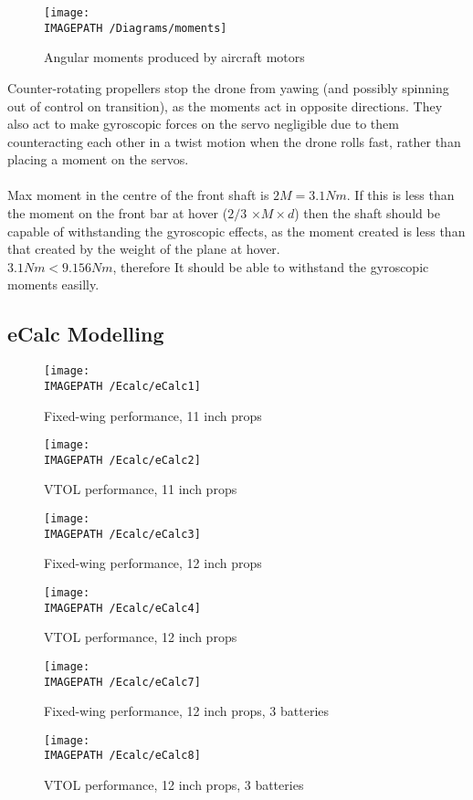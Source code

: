 \begin{figure}[!ht]
	\centering
	\texttt{[image: \\IMAGEPATH /Diagrams/moments]}
	\caption{Angular moments produced by aircraft motors}
	\label{fig:moments}
\end{figure}

 Counter-rotating propellers stop the drone from yawing (and possibly spinning out of control on transition), as the moments act in opposite directions. They also act to make gyroscopic forces on the servo negligible due to them counteracting each other in a twist motion when the drone rolls fast, rather than placing a moment on the servos.\\\\
Max moment in the centre of the front shaft is $2M = 3.1Nm$. If this is less than the moment on the front bar at hover ($2/3$ $\times M \times d$) then the shaft should be capable of withstanding the gyroscopic effects, as the moment created is less than that created by the weight of the plane at hover.\\

$3.1Nm < 9.156Nm$, therefore It should be able to withstand the gyroscopic moments easilly.

\subsection{eCalc Modelling}
\label{sec:ecalc}
\begin{figure}[H]
	\centering
	\texttt{[image: \\IMAGEPATH /Ecalc/eCalc1]}
	\caption{Fixed-wing performance, 11 inch props}
\end{figure}
\begin{figure}[H]
	\centering
	\texttt{[image: \\IMAGEPATH /Ecalc/eCalc2]}
	\caption{VTOL performance, 11 inch props}
\end{figure}
\begin{figure}[H]
	\centering
	\texttt{[image: \\IMAGEPATH /Ecalc/eCalc3]}
	\caption{Fixed-wing performance, 12 inch props}
	\label{fig:fixed}
\end{figure}
\begin{figure}[H]
	\centering
	\texttt{[image: \\IMAGEPATH /Ecalc/eCalc4]}
	\caption{VTOL performance, 12 inch props}
	\label{fig:vtol}
\end{figure}
\begin{figure}[H]
	\centering
	\texttt{[image: \\IMAGEPATH /Ecalc/eCalc7]}
	\caption{Fixed-wing performance, 12 inch props, 3 batteries}
\end{figure}
\begin{figure}[H]
	\centering
	\texttt{[image: \\IMAGEPATH /Ecalc/eCalc8]}
	\caption{VTOL performance, 12 inch props, 3 batteries}
\end{figure}

